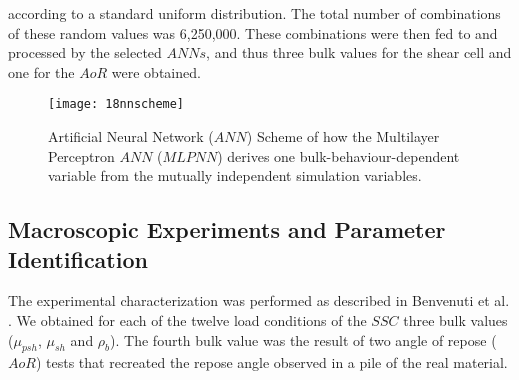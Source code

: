 \documentclass{llncs}
\begin{document}
according to a standard uniform distribution.
The total number of combinations of these random values was 6,250,000.
These combinations were then fed to and processed by the selected
$ANNs$, and thus three bulk values for the shear
cell and one for the $AoR$ were obtained.
\begin{figure}[!htb] 
\centering 
\texttt{[image: 18nnscheme]} 
\caption[ANN Scheme]{Artificial Neural Network ($ANN$) Scheme
of how the Multilayer Perceptron $ANN$ ($MLPNN$) derives one
bulk-behaviour-dependent variable from the mutually independent simulation variables.}
\label{fig:18nnscheme} 
\end{figure}

\subsection{Macroscopic Experiments and Parameter Identification}
\label{subsec:macroscopicexperimentsparameteridentification}
The experimental characterization was performed as described in
Benvenuti et al. \cite{RefWorks:180}. 
We obtained for each of the twelve load conditions of the $SSC$ three bulk
values ($\mu_{psh}$, $\mu_{sh}$ and $\rho_b$).
The fourth bulk value was the result of two angle of repose ($AoR$) tests that
recreated the repose angle observed in a pile of the
real material. 
\end{document}
